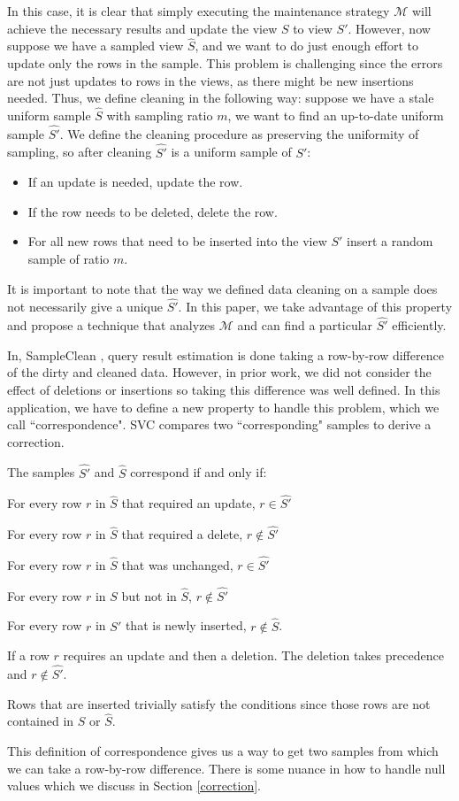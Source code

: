 In this case, it is clear that simply executing the maintenance strategy $\mathcal{M}$ will achieve the necessary results and update the view $S$ to view $S'$.
However, now suppose we have a sampled view $\hat{S}$, and we want to do just enough effort to update only the rows in the sample.
This problem is challenging since the errors are not just updates to rows in the views, as there might be new insertions needed.
Thus, we define cleaning in the following way: suppose we have a stale uniform sample $\hat{S}$ with sampling ratio $m$, we want to find an up-to-date uniform sample $\hat{S'}$.
We define the cleaning procedure as preserving the uniformity of sampling, so after cleaning $\hat{S'}$ is a uniform sample of $S'$:
\begin{itemize}
\item If an update is needed, update the row.
\item If the row needs to be deleted, delete the row.
\item For all new rows that need to be inserted into the view $S'$ insert a random sample of ratio $m$.
\end{itemize}
It is important to note that the way we defined data cleaning on a sample does not necessarily give a unique $\hat{S'}$. 
In this paper, we take advantage of this property and propose a technique that analyzes $\mathcal{M}$ and can find a particular $\hat{S'}$
efficiently.

In, SampleClean \cite{wang1999sample}, \nsc query result estimation is done taking a row-by-row difference of the dirty and cleaned data.
However, in prior work, we did not consider the effect of deletions or insertions so taking this difference was well defined.
In this application, we have to define a new property to handle this problem, which we call ``correspondence".
SVC compares two ``corresponding" samples to derive a correction. 
\begin{definition}[Correspondence]
The samples $\hat{S'}$ and $\hat{S}$ correspond if and only if:
\item For every row $r$ in $\hat{S}$ that required an update, $r\in \hat{S'}$
\item For every row $r$ in $\hat{S}$ that required a delete, $r \not\in \hat{S'}$
\item For every row $r$ in $\hat{S}$  that was unchanged, $r \in \hat{S'}$
\item For every row $r$ in $S$ but not in $\hat{S}$, $r \not\in \hat{S'}$
\item For every row $r$ in $S'$ that is newly inserted, $r \not\in \hat{S}$.
\item If a row $r$ requires an update and then a deletion. The deletion takes precedence and $r \not\in \hat{S'}$.
\item Rows that are inserted trivially satisfy the conditions since those rows are not contained in $S$ or $\hat{S}$.
\end{definition}
This definition of correspondence gives us a way to get two samples from which we can take a row-by-row difference.
There is some nuance in how to handle null values which we discuss in Section \ref{correction}.

